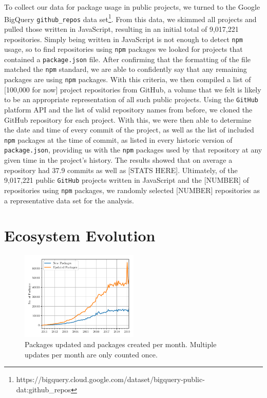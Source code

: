 \documentclass[10pt,conference]{IEEEtran}
\def\code#1{\texttt{#1}}
\begin{document}
To collect our data for package usage in public projects, 
we turned to the Google BigQuery \code{github\_repos} data 
set\footnote{https://bigquery.cloud.google.com/dataset/bigquery-public-dat:github\_repos}.
From this data, we skimmed all projects and pulled those 
written in JavaScript, resulting in an initial total of 9,017,221 
repositories. Simply being written in JavaScript is not enough to detect
\code{npm} usage, so to find repositories using \code{npm} packages
we looked for projects that contained a \code{package.json} 
file. After confirming that the formatting of the file matched the \code{npm}
standard, we are able to confidently say that any remaining packages are 
using \code{npm} packages. With this criteria, we then compiled a list 
of [100,000 for now] project 
repositories from GitHub, a volume that we felt is likely to be an 
appropriate representation of all such public projects.
Using the \code{GitHub} platform API and the list of valid repository names 
from before, we cloned the GitHub repository for each project. With
this, we were then able to determine the date and time of every 
commit of the project, as well as the list of included \code{npm} packages
at the time of commit, as listed in every historic version of 
\code{package.json}, providing us with the \code{npm} packages used by that repository
at any given time in the project's history. The results showed that on average a repository 
had 37.9 commits as well as [STATS HERE]. Ultimately, of the 9,017,221 
public \code{GitHub} projects written in JavaScript and the [NUMBER] of repositories
using \code{npm} packages, we randomly selected [NUMBER] repositories as
a representative data set for the analysis.


\section{Ecosystem Evolution}

\begin{figure}
  \includegraphics[width=0.5\textwidth]{figures/new_vs_updates_by_month.pdf}
  \caption{Packages updated and packages created per month. Multiple updates per month are
  only counted once.}
  \label{npmGrowth}
\end{figure}
\end{document}
